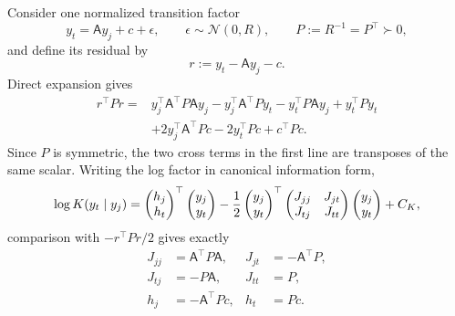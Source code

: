 Consider one normalized transition factor
\begin{equation}
y_t=\mathsf A y_j+c+\epsilon,
\qquad
\epsilon\sim\mathcal N(0,R),
\qquad
P:=R^{-1}=P^\top\succ0,
\label{eq:linear-gaussian-factor-setup}
\end{equation}
and define its residual by
\begin{equation}
r:=y_t-\mathsf A y_j-c.
\label{eq:linear-gaussian-transition-residual}
\end{equation}
Direct expansion gives
\begin{equation}
\begin{aligned}
r^\top P r
={}&y_j^\top \mathsf A^\top P\mathsf A y_j
-y_j^\top \mathsf A^\top P y_t
-y_t^\top P\mathsf A y_j
+y_t^\top P y_t\\
&+2y_j^\top \mathsf A^\top P c
-2y_t^\top P c
+c^\top P c.
\end{aligned}
\label{eq:expanded-linear-gaussian-residual}
\end{equation}
Since $P$ is symmetric, the two cross terms in the first line are transposes of the same scalar. Writing the log factor in canonical information form,
\begin{equation}
\log K(y_t\mid y_j)
=
\begin{pmatrix}h_j\\h_t\end{pmatrix}^{\top}
\begin{pmatrix}y_j\\y_t\end{pmatrix}
-\frac12
\begin{pmatrix}y_j\\y_t\end{pmatrix}^{\top}
\begin{pmatrix}
J_{jj}&J_{jt}\\
J_{tj}&J_{tt}
\end{pmatrix}
\begin{pmatrix}y_j\\y_t\end{pmatrix}
+C_K,
\label{eq:linear-gaussian-canonical-factor}
\end{equation}
comparison with $-r^\top P r/2$ gives exactly
\begin{equation}
\boxed{
\begin{aligned}
J_{jj}&=\mathsf A^\top P\mathsf A,
&J_{jt}&=-\mathsf A^\top P,\\
J_{tj}&=-P\mathsf A,
&J_{tt}&=P,\\
h_j&=-\mathsf A^\top P c,
&h_t&=P c.
\end{aligned}}
\label{eq:linear-gaussian-information-blocks}
\end{equation}
